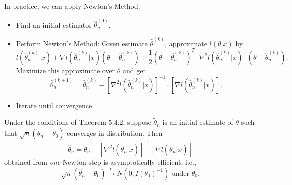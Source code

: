 \documentclass[a4paper]{article}
\begin{document}
\begin{answer}
	In practice, we can apply Newton's Method:
	\begin{itemize}
		\item Find an initial estimator $\hat{\theta}_n^{(0)}$.
		\item Perform Newton's Method: Given estimate $\hat{\theta}^{(k)}$, approximate $l(\theta|x)$ by
		\begin{equation}
			l\left(\hat{\theta}_n^{(k)}|x\right) + \nabla l\left(\hat{\theta}_n^{(k)}|x\right)\left(\theta - \hat{\theta}_n^{(k)}\right) + \frac{1}{2}\left(\theta - \hat{\theta}_n^{(k)}\right)^T \cdot \nabla^2 l(\hat{\theta}_n^{(k)}|x) \cdot \left(\theta - \hat{\theta}_n^{(k)}\right).
		\end{equation}
		Maximize this approximate over $\theta$ and get
		\begin{equation}
			\hat{\theta}_n^{(k+1)} = \hat{\theta}_n^{(k)} - \left[\nabla^2 l(\hat{\theta}_n^{(k)}|x)\right]^{-1} \cdot \left[\nabla l(\hat{\theta}_n^{(k)}|x)\right].
		\end{equation}
		\item Iterate until convergence.
	\end{itemize}
	\begin{center}
	\end{center}
\end{answer}

\begin{thm}
	Under the conditions of Theorem 5.4.2, suppose $\tilde{\theta}_n$ is an initial estimate of $\theta$ such that $\sqrt{n}(\tilde{\theta}_n-\theta_0)$ converges in distribution. Then
	\begin{equation}
		\hat{\theta}_n = \tilde{\theta}_n - \left[\nabla^2 l(\tilde{\theta}_n | x)\right]^{-1} \left[\nabla l(\tilde{\theta}_n | x)\right]
	\end{equation}
	obtained from \emph{one} Newton step is asymptotically efficient, i.e.,
	\begin{equation}
		\sqrt{n}(\hat{\theta}_n - \theta_0) \stackrel{\text{d}}{\longrightarrow} N(0,I(\theta_0)^{-1}) \text{ under } \theta_0.
	\end{equation}
\end{thm}
\end{document}
